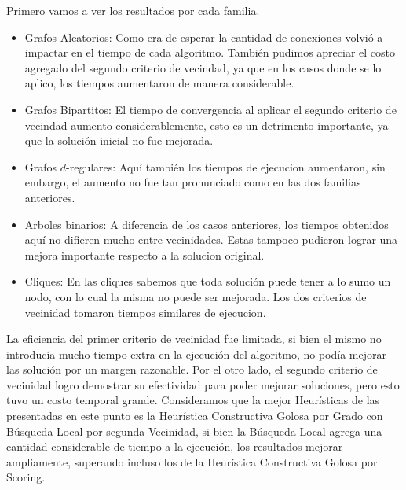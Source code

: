 Primero vamos a ver los resultados por cada familia.

\begin{itemize}
	\item Grafos Aleatorios: Como era de esperar la cantidad de conexiones volvió a impactar en el tiempo de cada algoritmo. También pudimos apreciar el costo agregado del segundo criterio de vecindad, ya que en los casos donde se lo aplico, los tiempos aumentaron de manera considerable.
	\item Grafos Bipartitos: El tiempo de convergencia al aplicar el segundo criterio de vecindad aumento considerablemente, esto es un detrimento importante, ya que la solución inicial no fue mejorada.
	\item Grafos $d$-regulares: Aquí también los tiempos de ejecucion aumentaron, sin embargo, el aumento no fue tan pronunciado como en las dos familias anteriores.
	\item Arboles binarios: A diferencia de los casos anteriores, los tiempos obtenidos aquí no difieren mucho entre vecinidades. Estas tampoco pudieron lograr una mejora importante respecto a la solucion original.
	\item Cliques: En las cliques sabemos que toda solución puede tener a lo sumo un nodo, con lo cual la misma no puede ser mejorada. Los dos criterios de vecinidad tomaron tiempos similares de ejecucion.
\end{itemize}

La eficiencia del primer criterio de vecinidad fue limitada, si bien el mismo no introducía mucho tiempo extra en la ejecución del algoritmo, no podía mejorar las solución por un margen razonable. Por el otro lado, el segundo criterio de vecinidad logro demostrar su efectividad para poder mejorar soluciones, pero esto tuvo un costo temporal grande. Consideramos que la mejor Heurísticas de las presentadas en este punto es la Heurística Constructiva Golosa por Grado con Búsqueda Local por segunda Vecinidad, si bien la Búsqueda Local agrega una cantidad considerable de tiempo a la ejecución, los resultados mejorar ampliamente, superando incluso los de la Heurística Constructiva Golosa por Scoring.